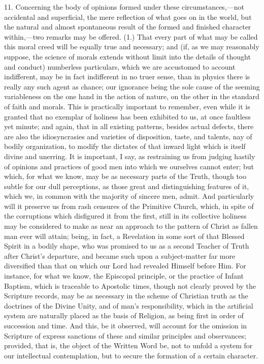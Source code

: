 11. Concerning the body of opinions formed under these
circumstances,—not accidental and superficial, the mere reflection
of what goes on in the world, but the natural and almost spontaneous
result of the formed and finished character within,—two remarks may
be offered. (1.) That every part of what may be called this moral
creed will be equally true and necessary; and (if, as we may
reasonably suppose, the science of morals extends without limit into
the details of thought and conduct) numberless particulars, which we
are accustomed to account indifferent, may be in fact indifferent in
no truer sense, than in physics there is really any such agent as
chance; our ignorance being the sole cause of the seeming variableness
on the one hand in the action of nature, on the other in the standard
of faith and morals. This is practically important to remember,
even while it is granted that no exemplar of holiness has been
exhibited to us, at once faultless yet minute; and again, that in all
existing patterns, besides actual defects, there are also the
idiosyncrasies and varieties of disposition, taste, and talents, nay
of bodily organization, to modify the dictates of that inward light
which is itself divine and unerring. It is important, I say, as
restraining us from judging hastily of opinions and practices of good
men into which we ourselves cannot enter; but which, for what we know,
may be as necessary parts of the Truth, though too subtle for our dull
perceptions, as those great and distinguishing features of it, which
we, in common with the majority of sincere men, admit. And
particularly will it preserve us from rash censures of the Primitive
Church, which, in spite of the corruptions which disfigured it from
the first, still in its collective holiness may be considered to make
as near an approach to the pattern of Christ as fallen man ever will
attain; being, in fact, a Revelation in some sort of that Blessed
Spirit in a bodily shape, who was promised to us as a second Teacher
of Truth after Christ's departure, and became such upon a
subject-matter far more diversified than that on which our Lord had
revealed Himself before Him. For instance, for what we know, the
Episcopal principle, or the practice of Infant Baptism, which is
traceable to Apostolic times, though not clearly proved by the
Scripture records, may be as necessary in the scheme of Christian
truth as the doctrines of the Divine Unity, and of man's
responsibility, which in the artificial system are naturally placed as
the basis of Religion, as being first in order of succession and time.
And this, be it observed, will account for the omission in Scripture
of express sanctions of these and similar principles and observances;
provided, that is, the object of the Written Word be, not to unfold a
system for our intellectual contemplation, but to secure the formation
of a certain character.

